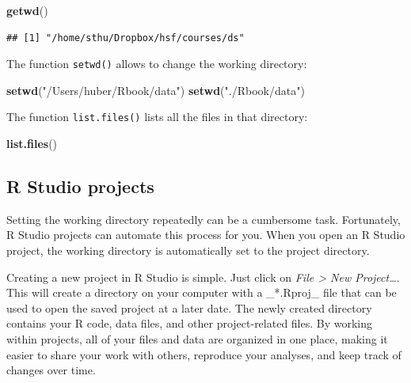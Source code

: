 \documentclass[
  12pt,
  oneside]{book}
\newenvironment{Shaded}{\begin{snugshade}}{\end{snugshade}}
\newcommand{\FunctionTok}[1]{\textcolor[rgb]{0.13,0.29,0.53}{\textbf{#1}}}
\newcommand{\NormalTok}[1]{#1}
\newcommand{\StringTok}[1]{\textcolor[rgb]{0.31,0.60,0.02}{#1}}
\theoremstyle{definition}
\theoremstyle{definition}
\theoremstyle{definition}
\theoremstyle{definition}
\theoremstyle{remark}
\begin{document}
\begin{Shaded}
\begin{Highlighting}[]
\FunctionTok{getwd}\NormalTok{()}
\end{Highlighting}
\end{Shaded}

\begin{verbatim}
## [1] "/home/sthu/Dropbox/hsf/courses/ds"
\end{verbatim}

The function \texttt{setwd()} allows to change the working directory:

\begin{Shaded}
\begin{Highlighting}[]
\FunctionTok{setwd}\NormalTok{(}\StringTok{"/Users/huber/Rbook/data"}\NormalTok{)}
\FunctionTok{setwd}\NormalTok{(}\StringTok{"./Rbook/data"}\NormalTok{)}
\end{Highlighting}
\end{Shaded}

The function \texttt{list.files()} lists all the files in that directory:

\begin{Shaded}
\begin{Highlighting}[]
\FunctionTok{list.files}\NormalTok{()}
\end{Highlighting}
\end{Shaded}

\hypertarget{sec:rstudioprojects}{%
\subsection{R Studio projects}\label{sec:rstudioprojects}}

Setting the working directory repeatedly can be a cumbersome task. Fortunately, R Studio projects can automate this process for you. When you open an R Studio project, the working directory is automatically set to the project directory.

Creating a new project in R Studio is simple. Just click on \emph{File \textgreater{} New Project\ldots{}}. This will create a directory on your computer with a \_*.Rproj\_ file that can be used to open the saved project at a later date. The newly created directory contains your R code, data files, and other project-related files. By working within projects, all of your files and data are organized in one place, making it easier to share your work with others, reproduce your analyses, and keep track of changes over time.
\end{document}
